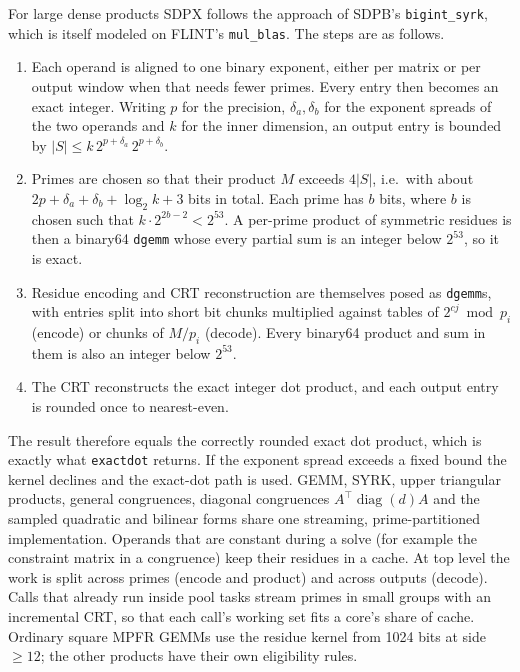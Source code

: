 \documentclass[11pt]{article}
\newcommand{\code}[1]{\texttt{#1}}
\begin{document}
For large dense products SDPX follows the approach of SDPB's
\code{bigint\_syrk}, which is itself modeled on FLINT's \code{mul\_blas}. The
steps are as follows.
\begin{enumerate}
  \item Each operand is aligned to one binary exponent, either per matrix or
    per output window when that needs fewer primes. Every entry then becomes
    an exact integer. Writing $p$ for the precision, $\delta_a,\delta_b$ for
    the exponent spreads of the two operands and $k$ for the inner
    dimension, an output entry is bounded by
    $|S| \le k\, 2^{p+\delta_a}\, 2^{p+\delta_b}$.
  \item Primes are chosen so that their product $M$ exceeds $4|S|$, i.e.\
    with about $2p + \delta_a + \delta_b + \log_2 k + 3$ bits in total. Each
    prime has $b$ bits, where $b$ is chosen such that
    $k\cdot 2^{2b-2} < 2^{53}$. A per-prime product of symmetric residues is
    then a binary64 \code{dgemm} whose every partial sum is an integer
    below $2^{53}$, so it is exact.
  \item Residue encoding and CRT reconstruction are themselves posed as
    \code{dgemm}s, with entries split into short bit chunks multiplied
    against tables of $2^{cj} \bmod p_i$ (encode) or chunks of $M/p_i$
    (decode). Every binary64 product and sum in them is also an integer
    below $2^{53}$.
  \item The CRT reconstructs the exact integer dot product, and each output
    entry is rounded once to nearest-even.
\end{enumerate}
The result therefore equals the correctly rounded exact dot product, which is
exactly what \code{exactdot} returns. If the exponent spread exceeds a fixed
bound the kernel declines and the exact-dot path is used. GEMM, SYRK, upper
triangular products, general congruences, diagonal congruences
$A^\top\operatorname{diag}(d)A$ and the sampled quadratic and bilinear forms
share one streaming, prime-partitioned implementation. Operands that are
constant during a solve (for example the constraint matrix in a congruence)
keep their residues in a cache. At top level the work is split across primes
(encode and product) and across outputs (decode). Calls that already run
inside pool tasks stream primes in small groups with an incremental CRT, so
that each call's working set fits a core's share of cache. Ordinary square
MPFR GEMMs use the residue kernel from 1024 bits at side $\ge 12$; the other
products have their own eligibility rules.
\end{document}
